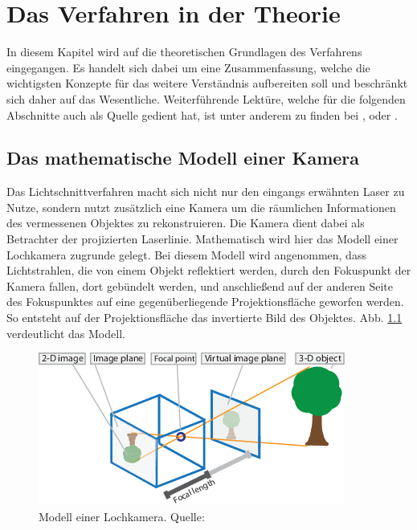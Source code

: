 \chapter{Das Verfahren in der Theorie}
In diesem Kapitel wird auf die theoretischen Grundlagen des Verfahrens eingegangen. Es handelt sich dabei um eine Zusammenfassung, welche die wichtigsten Konzepte für das weitere Verständnis aufbereiten soll und beschränkt sich daher auf das Wesentliche. Weiterführende Lektüre, welche für die folgenden Abschnitte auch als Quelle gedient hat, ist unter anderem zu finden bei \cite{Simek:12}, \cite{Mathworks:17b} oder \cite{Rahmann}.

\section{Das mathematische Modell einer Kamera}
Das Lichtschnittverfahren macht sich nicht nur den eingangs erwähnten Laser zu Nutze, sondern nutzt zusätzlich eine Kamera um die räumlichen Informationen des vermessenen Objektes zu rekonstruieren. Die Kamera dient dabei als Betrachter der projizierten Laserlinie. Mathematisch wird hier das Modell einer Lochkamera zugrunde gelegt. Bei diesem Modell wird angenommen, dass Lichtstrahlen, die von einem Objekt reflektiert werden, durch den Fokuspunkt der Kamera fallen, dort gebündelt werden, und anschließend auf der anderen Seite des Fokuspunktes auf eine gegenüberliegende Projektionsfläche geworfen werden. So entsteht auf der Projektionsfläche das invertierte Bild des Objektes. Abb. \ref{fig:lochkamera} verdeutlicht das Modell. 

\begin{figure}
\centering \includegraphics{images/lochkamera.png}
\caption[Modell einer Lochkamera]{Modell einer Lochkamera. Quelle: \cite{Mathworks:17b}}\label{fig:lochkamera}
\end{figure}

